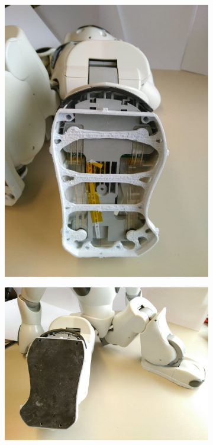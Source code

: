 \begin{figure}[htb]
	\hfill
	\begin{subfigure}[c]{0.35\linewidth}
		\centering
		\includegraphics[width=\linewidth]{Bilder/Schuh_an_NAO_ohne_Sohle.jpg}
	\end{subfigure}
	\hfill
	\begin{subfigure}[c]{0.622\linewidth}
		\centering
		\includegraphics[width=\linewidth]{Bilder/Schuh_an_NAO_mit_Sohle.jpg}

\end{subfigure}
\end{figure}
